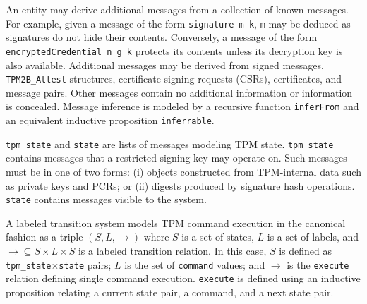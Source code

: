 \documentclass[runningheads]{llncs}
\begin{document}
An entity may derive additional messages from a collection of known
messages.  For example, given a message of the form
\verb|signature m k|, \verb|m| may be deduced as signatures do not
hide their contents.  Conversely, a message of the form
\verb|encryptedCredential n g k| protects its contents unless its
decryption key is also available.  Additional messages may be derived
from signed messages, \verb|TPM2B_Attest| structures, certificate
signing requests (CSRs), certificates, and message pairs. Other
messages contain no additional information or information is
concealed.  Message inference is modeled by a recursive function
\verb|inferFrom| and an equivalent inductive proposition
\verb|inferrable|.

\verb|tpm_state| and \verb|state| are lists of messages modeling TPM
state. \verb|tpm_state| contains messages that a restricted signing
key may operate on. Such messages must be in one of two forms: (i)
objects constructed from TPM-internal data such as private keys and
PCRs; or (ii) digests produced by signature hash operations.
\verb|state| contains messages visible to the system.

A labeled transition system models TPM command execution in the
canonical fashion as a triple $(S,L,\rightarrow)$ where $S$ is a set
of states, $L$ is a set of labels, and
$\rightarrow \subseteq S \times L \times S$ is a labeled transition
relation.  In this case, $S$ is defined as
\verb|tpm_state|$\times$\verb|state| pairs; $L$ is the set of
\verb|command| values; and $\rightarrow$ is the \verb|execute|
relation defining single command execution.  \verb|execute| is defined
using an inductive proposition relating a current state pair, a
command, and a next state pair.


\end{document}
